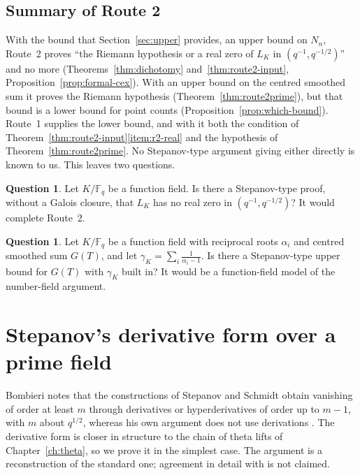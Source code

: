 \documentclass[11pt]{amsbook}
\theoremstyle{plain}
\theoremstyle{definition}
\newtheorem{question}[theorem]{Question}
\theoremstyle{remark}
\numberwithin{equation}{section}
\numberwithin{figure}{chapter}
\numberwithin{table}{chapter}
\newcommand{\F}{\mathbb{F}}
\begin{document}
\subsection{Summary of Route 2}

With the bound that Section~\ref{sec:upper} provides, an upper
bound on $N_n$, Route~2 proves ``the Riemann hypothesis or a real
zero of $L_K$ in $(q^{-1},q^{-1/2})$'' and no more
(Theorems~\ref{thm:dichotomy} and~\ref{thm:route2-input},
Proposition~\ref{prop:formal-cex}). With an upper bound on the
centred smoothed sum it proves the Riemann hypothesis
(Theorem~\ref{thm:route2prime}), but that bound is a lower bound
for point counts (Proposition~\ref{prop:which-bound}). Route~1
supplies the lower bound, and with it both the condition of
Theorem~\ref{thm:route2-input}\eqref{item:r2-real} and the
hypothesis of Theorem~\ref{thm:route2prime}. No Stepanov-type
argument giving either directly is known to us. This leaves two
questions.

\begin{question}\label{q:real-zero}
Let $K/\F_q$ be a function field. Is there a Stepanov-type proof,
without a Galois closure, that $L_K$ has no real zero in
$(q^{-1},q^{-1/2})$? It would complete Route~2.
\end{question}

\begin{question}\label{q:smoothed}
Let $K/\F_q$ be a function field with reciprocal roots $\alpha_i$
and centred smoothed sum $G(T)$, and let
$\gamma_K=\sum_i\frac1{\alpha_i-1}$. Is there a Stepanov-type upper
bound for $G(T)$ with $\gamma_K$ built in? It would be a
function-field model of the number-field argument.
\end{question}

\section{Stepanov's derivative form over a prime field}
\label{sec:variantJ}

Bombieri notes that the constructions of Stepanov and Schmidt
obtain vanishing of order at least $m$ through derivatives or
hyperderivatives of order up to $m-1$, with $m$ about $q^{1/2}$,
whereas his own argument does not use derivations
\cite[p.~235]{Bombieri1974}. The derivative form is closer in
structure to the chain of theta lifts of Chapter~\ref{ch:theta}, so
we prove it in the simplest case. The argument is a reconstruction
of the standard one; agreement in detail with \cite{Stepanov1969}
is not claimed.
\end{document}
